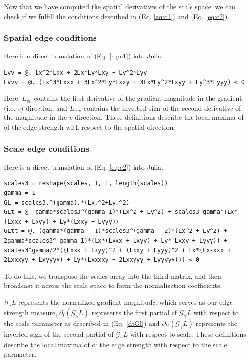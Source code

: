 \documentclass{article}
\begin{document}
Now that we have computed the spatial derivatives of the scale space, we can check if we fulfill the conditions described in (Eq. \ref{eq:c1}) and (Eq. \ref{eq:c2}).

\subsubsection{Spatial edge conditions}
Here is a direct translation of (Eq. \ref{eq:c1}) into Julia.
\begin{lstlisting}
Lvv = @. Lx^2*Lxx + 2Lx*Ly*Lxy + Ly^2*Lyy
Lvvv = @. (Lx^3*Lxxx + 3Lx^2*Ly*Lxxy + 3Lx*Ly^2*Lxyy + Ly^3*Lyyy) < 0
\end{lstlisting}
Here, $L_{vv}$ contains the first derivative of the gradient magnitude in the gradient (i.e. $v$) direction, and $L_{vvv}$ contains the inverted sign of the second derivative of the magnitude in the $v$ direction.
These definitions describe the local maxima of of the edge strength with respect to the spatial direction.

\subsubsection{Scale edge conditions}
Here is a direct translation of (Eq. \ref{eq:c2}) into Julia.
\begin{lstlisting}
scales3 = reshape(scales, 1, 1, length(scales))
gamma = 1
GL = scales3.^(gamma).*(Lx.^2+Ly.^2)
GLt = @. gamma*scales3^(gamma-1)*(Lx^2 + Ly^2) + scales3^gamma*(Lx*(Lxxx + Lxyy) + Ly*(Lxxy + Lyyy))
GLtt = @. (gamma*(gamma - 1)*scales3^(gamma - 2)*(Lx^2 + Ly^2) + 2gamma*scales3^(gamma-1)*(Lx*(Lxxx + Lxyy) + Ly*(Lxxy + Lyyy)) + scales3^gamma/2*((Lxxx + Lxyy)^2 + (Lxxy + Lyyy)^2 + Lx*(Lxxxxx + 2Lxxxyy + Lxyyyy) + Ly*(Lxxxxy + 2Lxxyyy + Lyyyyy))) < 0
\end{lstlisting}
To do this, we transpose the scales array into the third matrix, and then broadcast it across the scale space to form the normalization coefficients.

$\mathcal G_\gamma L$ represents the normalized gradient magnitude, which serves as our edge strength measure, $\partial_t(\mathcal G_\gamma L)$ represents the first partial of $\mathcal G_\gamma L$ with respect to the scale parameter as described in (Eq. \ref{dtGl})
and $\partial_{tt}(\mathcal G_\gamma L)$ represents the inverted sign of the second partial of $\mathcal G_\gamma L$ with respect to scale.
These definitions describe the local maxima of of the edge strength with respect to the scale parameter.
\end{document}
